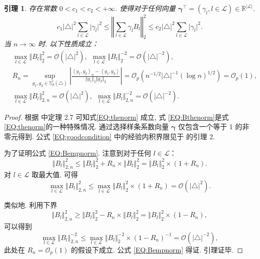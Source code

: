 \documentclass[a4paper,openay,14pt]{ctexbook}
\newtheorem{lem}{引理}
\numberwithin{equation}{section}
\numberwithin{lem}{section}
\begin{document}
\begin{lem}\label{Lemma:BProperty}
    存在常数 $0<c_1<c_2<+\infty$. 使得对于任何向量 $\bm{\gamma}^{\top} = (\gamma_l,l\in\mathcal{L})\in \mathbb{R}^{\vert\mathcal{L}\vert}$.
    \begin{equation}\label{EQ:thenorm}
    c_1\vert\triangle\vert^2\sum_{l\in\mathcal{L}}\vert\gamma_l\vert^2 \leq \left\Vert \sum_{l\in\mathcal{L}}\gamma_lB_l\right\Vert^2_2\leq c_2\vert\triangle\vert^2\sum_{l\in\mathcal{L}}\vert\gamma_l\vert^2.
    \end{equation}
    当 $n\to\infty$ 时. 以下性质成立：
    \begin{align}
        &\max_{l\in\mathcal{L}}\Vert B_l\Vert_2^2 = \mathcal{O}\left(\vert\triangle\vert^2\right),~ ~\max_{l\in\mathcal{L}}\Vert B_l\Vert_2^{-2} = \mathcal{O}\left(\vert\triangle\vert^{-2}\right),\label{EQ:Bthenorm}\\
        &R_n = \sup_{g_1,g_2\in \mathbb{S}_{d}^{r}(\triangle)}\left\vert\frac{\left<g_1,g_2\right>_{n}-\left<g_1,g_2\right>}{\Vert g_1\Vert_2\Vert g_2\Vert_2}\right\vert = \mathcal{O}_p\left( n^{-1/2}\vert\triangle\vert^{-1}\left(\log n\right)^{1/2}\right) = {\scriptstyle{\mathcal{O}}_{p}}(1),\label{EQ:goodcondition}\\
        &\max_{l\in\mathcal{L}}\Vert B_l\Vert_{2,n}^2 = \mathcal{O}(\vert\triangle\vert^2), ~ ~ \max_{l\in\mathcal{L}}\Vert B_l\Vert_{2,n}^{-2} = \mathcal{O}(\vert\triangle\vert^{-2}) \label{EQ:Bempnorm}.
    \end{align}    
\end{lem}
\begin{proof}
根据 \cite{lai2007spline} 中定理 2.7 可知式\eqref{EQ:thenorm} 成立, 式 \eqref{EQ:Bthenorm}是式\eqref{EQ:thenorm}的一种特殊情况. 通过选择样条系数向量 $\bm{\gamma}$ 仅包含一个等于 1 的非零元得到. 公式 \eqref{EQ:goodcondition} 中的经验内积界限见于 \cite{lai2013bivariate} 的引理 2.

为了证明公式 \eqref{EQ:Bempnorm}. 注意到对于任何 $l \in \mathcal{L}$：
\[
\left\Vert B_l \right\Vert_{2,n}^2 
\leq \left\Vert B_l \right\Vert_2^2 + R_n \times \left\Vert B_l \right\Vert_2^2 
= \left\Vert B_l \right\Vert_2^2 \times (1 + R_n).
\]
对 $l \in \mathcal{L}$ 取最大值. 可得
\[
\max_{l \in \mathcal{L}} \left\Vert B_l \right\Vert_{2,n}^2 
\leq \max_{l \in \mathcal{L}} \left\Vert B_l \right\Vert_2^2 \times (1 + R_n) 
= \mathcal{O}(|\triangle|^2).
\]

类似地. 利用下界
\[
\left\Vert B_l \right\Vert_{2,n}^2 
\geq \left\Vert B_l \right\Vert_2^2 - R_n \times \left\Vert B_l \right\Vert_2^2 
= \left\Vert B_l \right\Vert_2^2 \times (1 - R_n),
\]
可以得到
\[
\max_{l \in \mathcal{L}} \left\Vert B_l \right\Vert_{2,n}^{-2} 
\leq \max_{l \in \mathcal{L}} \left\Vert B_l \right\Vert_2^{-2} \times (1 - R_n)^{-1} 
= \mathcal{O}(|\triangle|^{-2}),
\]
此处在 $R_n = {\scriptstyle{\mathcal{O}}_{p}}(1)$ 的假设下成立. 公式 \eqref{EQ:Bempnorm} 得证. 引理证毕.
\end{proof}
\end{document}
